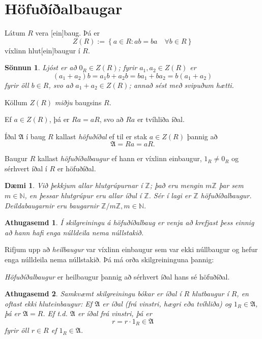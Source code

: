 \documentclass[a4paper,icelandic,11pt]{book}
\theoremstyle{plain}
\newtheorem{daemi}{Dæmi}[chapter]
\newtheorem*{ath}{Athugasemd}
\newtheorem*{sonnun}{Sönnun}
\newcommand{\N}{\mathbb{N}}
\newcommand{\Z}{\mathbb{Z}}
\begin{document}
\section{Höfuðíðalbaugar}
\begin{setn}
  Látum $R$ vera [ein]baug. Þá er
 \[
 Z(R) := \left\{ a\in R : ab = ba \quad \forall b\in R\right\}
 \]
 víxlinn hlut[ein]baugur í $R$.
\end{setn}
\begin{sonnun}
  Ljóst er að $0_R\in Z(R)$; fyrir $a_1,a_2\in Z(R)$ er\[
  (a_1 + a_2)b 
  = a_1 b + a_2 b 
  = ba_1 + ba_2
  = b(a_1 + a_2)
  \]
  fyrir öll $b\in R$, svo að $a_1 + a_2 \in Z(R)$; annað sést með svipuðum
  hætti.
\end{sonnun}
\begin{skilgr}
  Köllum $Z(R)$ \emph{miðju}
  baugsins $R$.
\end{skilgr}
Ef $a\in Z(R)$, þá er $Ra = aR$, svo að $Ra$ er tvíhliða íðal.
\begin{skilgr}
  Íðal $\mathfrak A$ í baug $R$ kallast
  \emph{höfuðíðal} ef til
  er stak $a\in Z(R)$ þannig að\[
  \mathfrak A = Ra = aR.
  \]
\end{skilgr}
\begin{skilgr}
  Baugur $R$ kallast
  \emph{höfuðíðalbaugur}
  ef hann er víxlinn einbaugur, $1_R\neq 0_R$ og sérhvert íðal í $R$ er
  höfuðíðal.
\end{skilgr}
\begin{daemi}
  Við þekkjum allar hlutgrúpurnar í $\Z$; það eru mengin $m\Z$ þar sem $m\in\N$,
  en þessar hlutgrúpur eru allar íðul í $\Z$. Sér í lagi er $\Z$
  \emph{höfuðíðalbaugur}. Deildabaugarnir eru baugarnir $\Z/m\Z,m\in\N$.
\end{daemi}
\begin{ath}
  Í skilgreiningu á höfuðíðalbaug er venja að krefjast þess einnig að hann hafi
  enga núlldeila nema núllstakið.
\end{ath}
Rifjum upp að \emph{heilbaugur} var víxlinn einbaugur sem var ekki núllbaugur og
hefur enga núlldeila nema núllstakið. Þá má orða skilgreininguna þannig:
\begin{skilgr}
  [endurbætt]
  \emph{Höfuðíðalbaugur} er heilbaugur þannig að sérhvert
  íðal hans sé höfuðíðal.
\end{skilgr}
\begin{ath}
  Samkvæmt skilgreiningu bókar er íðal í $R$ hlutbaugur í $R$, en oftast ekki
  \emph{hluteinbaugur}:
  Ef $\mathfrak A$ er íðal (frá vinstri, hægri eða tvíhliða) og $1_R\in\mathfrak
  A$, þá er $\mathfrak A = R$. Ef t.d.  $\mathfrak A$ er íðal frá vinstri, þá
  er \[
   r = r\cdot 1_R\in\mathfrak A
  \]
  fyrir öll $r\in R$ ef $1_R\in\mathfrak A$.
\end{ath}
\end{document}
